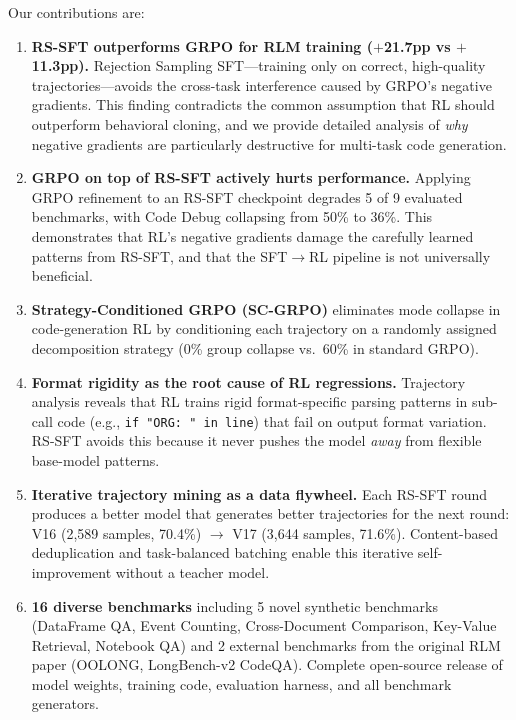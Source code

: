 \documentclass{article}
\begin{document}
Our contributions are:
\begin{enumerate}
    \item \textbf{RS-SFT outperforms GRPO for RLM training ($+$21.7pp vs $+$11.3pp).} Rejection Sampling SFT---training only on correct, high-quality trajectories---avoids the cross-task interference caused by GRPO's negative gradients. This finding contradicts the common assumption that RL should outperform behavioral cloning, and we provide detailed analysis of \emph{why} negative gradients are particularly destructive for multi-task code generation.

    \item \textbf{GRPO on top of RS-SFT actively hurts performance.} Applying GRPO refinement to an RS-SFT checkpoint degrades 5 of 9 evaluated benchmarks, with Code Debug collapsing from 50\% to 36\%. This demonstrates that RL's negative gradients damage the carefully learned patterns from RS-SFT, and that the SFT$\to$RL pipeline is not universally beneficial.

    \item \textbf{Strategy-Conditioned GRPO (SC-GRPO)} eliminates mode collapse in code-generation RL by conditioning each trajectory on a randomly assigned decomposition strategy (0\% group collapse vs.\ 60\% in standard GRPO).

    \item \textbf{Format rigidity as the root cause of RL regressions.} Trajectory analysis reveals that RL trains rigid format-specific parsing patterns in sub-call code (e.g., \texttt{if "ORG: " in line}) that fail on output format variation. RS-SFT avoids this because it never pushes the model \emph{away} from flexible base-model patterns.

    \item \textbf{Iterative trajectory mining as a data flywheel.} Each RS-SFT round produces a better model that generates better trajectories for the next round: V16 (2,589 samples, 70.4\%) $\to$ V17 (3,644 samples, 71.6\%). Content-based deduplication and task-balanced batching enable this iterative self-improvement without a teacher model.

    \item \textbf{16 diverse benchmarks} including 5 novel synthetic benchmarks (DataFrame QA, Event Counting, Cross-Document Comparison, Key-Value Retrieval, Notebook QA) and 2 external benchmarks from the original RLM paper (OOLONG, LongBench-v2 CodeQA). Complete open-source release of model weights, training code, evaluation harness, and all benchmark generators.
\end{enumerate}
\end{document}
